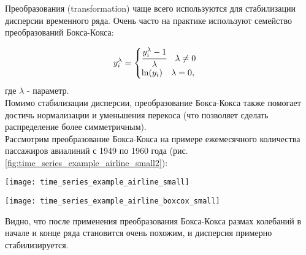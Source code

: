 Преобразования (transformation) чаще всего используются для стабилизации 
дисперсии временного ряда. Очень часто на практике используют семейство 
преобразований Бокса-Кокса:

\begin{equation*}
    y_i^{\lambda} = \begin{cases}
        \cfrac{y_i^{\lambda} - 1}{\lambda} \quad \lambda \neq 0 \\
    \ln(y_i) \quad \lambda = 0,
    \end{cases}
\end{equation*}
где $\lambda$ - параметр. \\

Помимо стабилизации дисперсии, преобразование Бокса-Кокса также помогает 
достичь нормализации и уменьшения перекоса (что позволяет сделать 
распределение более симметричным).\\

Рассмотрим преобразование Бокса-Кокса на примере ежемесячного 
количества пассажиров авиалиний с 1949 по 1960 года (рис. \ref{fig:time_series_example_airline_small2}):

\begin{center}
    \begin{minipage}{0.45\textwidth}
        \centering
        \texttt{[image: time\_series\_example\_airline\_small]}
        \label{fig:time_series_example_airline_small2}
    \end{minipage}
    \hfill
    \begin{minipage}{0.45\textwidth}
        \centering
        \texttt{[image: time\_series\_example\_airline\_boxcox\_small]}
        \label{fig:time_series_example_airline_boxcox_small}
    \end{minipage}
\end{center}

Видно, что после применения преобразования Бокса-Кокса размах колебаний в начале и
конце ряда становится очень похожим, и дисперсия примерно стабилизируется. 

